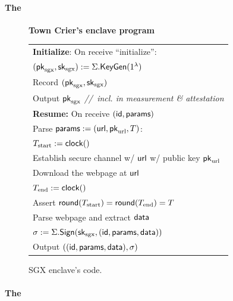 \paragraph{The \encname}

\begin{figure}[!h]
\begin{boxedminipage}{\columnwidth}
\begin{center}
{\bf Town Crier's enclave program}
\end{center}
\begin{tabular}{l}
{\bf Initialize}:  On receive ``initialize'': \\ %
\quad $({\sf pk}_{\textrm{sgx}}, {\sf sk}_{\textrm{sgx}}) := \Sigma.{\sf KeyGen}(1^\lambda)$\\
\quad Record $({\sf pk}_{\textrm{sgx}}, {\sf sk}_{\textrm{sgx}})$\\
\quad Output ${\sf pk}_{\textrm{sgx}}$   {\it //~incl. in measurement \& attestation } 
\\[5pt]

{\bf Resume:} On receive $({\sf id}, {\sf params})$\\
\quad Parse ${\sf params} := ({{\sf url}}, {\sf pk}_{\textrm{url}}, T) $:\\
\quad $T_{\textrm{start}} := {{\sf clock}}()$\\
\quad Establish secure channel w/ ${{\sf url}}$ w/ public key ${\sf pk}_{\textrm{url}}$ \\
\quad Download the webpage at ${{\sf url}}$\\
\quad $T_{\textrm{end}}: = {{\sf clock}}()$\\
\quad Assert ${\sf round}(T_{\textrm{start}}) = {\sf round}(T_{\textrm{end}}) = T$\\
\quad Parse webpage and extract ${\sf data}$\\
\quad $\sigma := \Sigma.{\sf Sign}({{\sf sk}_{\textrm{sgx}}}, ({\sf id}, {\sf params}, {\sf data}))$\\
\quad Output $(({\sf id}, {\sf params}, {\sf data}), \sigma)$
\end{tabular}
\end{boxedminipage}
\caption{
SGX enclave's code.
} 
\end{figure}

\paragraph{The \medname}

